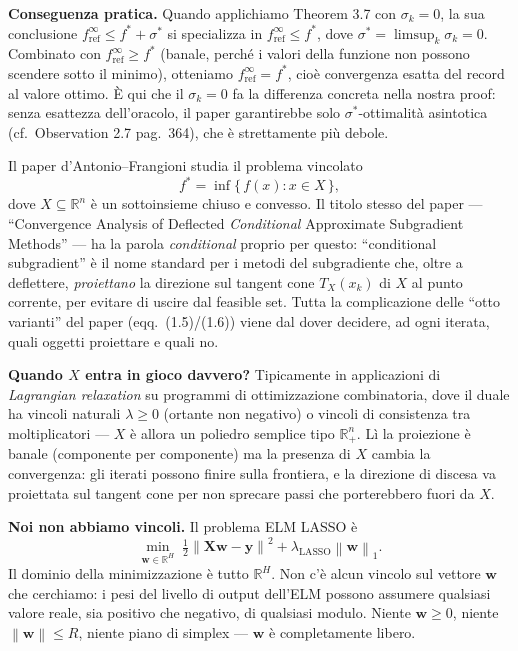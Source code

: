 \documentclass[11pt,a4paper]{article}
\newcommand{\R}{\mathbb{R}}
\newcommand{\norm}[1]{\left\|#1\right\|}
\newcommand{\bw}{\mathbf{w}}
\newcommand{\by}{\mathbf{y}}
\newcommand{\bX}{\mathbf{X}}
\theoremstyle{definition}
\begin{document}
\begin{tcolorbox}[intuition,title=Perché $\sigma_k = 0$? (cosa è ``oracolo esatto'')]
\textbf{Conseguenza pratica.} Quando applichiamo Theorem 3.7 con $\sigma_k = 0$, la sua conclusione $f^\infty_{\mathrm{ref}} \le f^* + \sigma^*$ si specializza in $f^\infty_{\mathrm{ref}} \le f^*$, dove $\sigma^* = \limsup_k \sigma_k = 0$. Combinato con $f^\infty_{\mathrm{ref}} \ge f^*$ (banale, perché i valori della funzione non possono scendere sotto il minimo), otteniamo $f^\infty_{\mathrm{ref}} = f^*$, cioè convergenza esatta del record al valore ottimo. È qui che il $\sigma_k = 0$ fa la differenza concreta nella nostra proof: senza esattezza dell'oracolo, il paper garantirebbe solo $\sigma^*$-ottimalità asintotica (cf.\ Observation 2.7 pag.\ 364), che è strettamente più debole.
\end{tcolorbox}

\begin{tcolorbox}[intuition,title=Perché $X = \R^H$? (cosa è ``unconstrained'')]
Il paper d'Antonio--Frangioni studia il problema vincolato
\[
f^* = \inf\{\, f(x) : x \in X \,\},
\]
dove $X \subseteq \R^n$ è un sottoinsieme chiuso e convesso. Il titolo stesso del paper --- ``Convergence Analysis of Deflected \emph{Conditional} Approximate Subgradient Methods'' --- ha la parola \emph{conditional} proprio per questo: ``conditional subgradient'' è il nome standard per i metodi del subgradiente che, oltre a deflettere, \emph{proiettano} la direzione sul tangent cone $T_X(x_k)$ di $X$ al punto corrente, per evitare di uscire dal feasible set. Tutta la complicazione delle ``otto varianti'' del paper (eqq.\ (1.5)/(1.6)) viene dal dover decidere, ad ogni iterata, quali oggetti proiettare e quali no.

\textbf{Quando $X$ entra in gioco davvero?} Tipicamente in applicazioni di \emph{Lagrangian relaxation} su programmi di ottimizzazione combinatoria, dove il duale ha vincoli naturali $\lambda \ge 0$ (ortante non negativo) o vincoli di consistenza tra moltiplicatori --- $X$ è allora un poliedro semplice tipo $\R^n_+$. Lì la proiezione è banale (componente per componente) ma la presenza di $X$ cambia la convergenza: gli iterati possono finire sulla frontiera, e la direzione di discesa va proiettata sul tangent cone per non sprecare passi che porterebbero fuori da $X$.

\textbf{Noi non abbiamo vincoli.} Il problema ELM LASSO è
\[
\min_{\bw \in \R^H} \;\tfrac{1}{2}\norm{\bX\bw - \by}^2 + \lambda_{\mathrm{LASSO}}\norm{\bw}_1.
\]
Il dominio della minimizzazione è tutto $\R^H$. Non c'è alcun vincolo sul vettore $\bw$ che cerchiamo: i pesi del livello di output dell'ELM possono assumere qualsiasi valore reale, sia positivo che negativo, di qualsiasi modulo. Niente $\bw \ge 0$, niente $\norm{\bw} \le R$, niente piano di simplex --- $\bw$ è completamente libero.


\end{tcolorbox}
\end{document}
